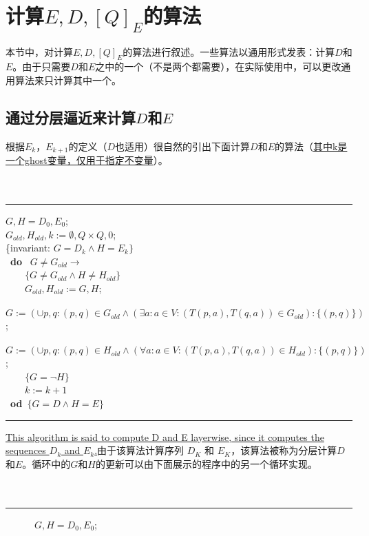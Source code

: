 
\chapter{计算$E,D,[Q]_E$的算法}
本节中，对计算$E,D,[Q]_E$的算法进行叙述。一些算法以通用形式发表：计算$D$和$E$。由于只需要$D$和$E$之中的一个（不是两个都需要），在实际使用中，可以更改通用算法来只计算其中一个。

\section{通过分层逼近来计算$D$和$E$}

根据$E_k$，$E_{k+1}$的定义（$D$也适用）很自然的引出下面计算$D$和$E$的算法（\uline{其中k是一个ghost变量，仅用于指定不变量}）。
\\
\\
\\
\rule{\textwidth}{1pt}
\mbox{}$G,H=D_0,E_0$;\\
\mbox{}$G_{old},H_{old},k:=\emptyset ,Q \times Q,0$;\\
\mbox{\{invariant:} $G=D_k \land H =E_k \}$\\
\mbox{ \textbf{do} } $G \not= G_{old} \longrightarrow$ \\
\mbox{　　}$\{G \not= G_{old} \land H \not= H_{old} \}$ \\
\mbox{　　}$G_{old},H_{old}:=G,H$;\\
\mbox{　　}$G:=(\cup  p,q:(p,q)\in G_{old}\land (\exists  a:a \in V : (T(p,a),T(q,a))\in G_{old} ) : \{(p,q)\})$; \\
\mbox{　　}$G:=(\cup  p,q:(p,q)\in H_{old}\land (\forall  a:a \in V : (T(p,a),T(q,a))\in H_{old} ) : \{(p,q)\})$; \\
\mbox{　　}$\{G=\neg H\}$ \\
\mbox{　　}$k:=k+1$ \\
\mbox{ \textbf{od} }$ \{ G=D \land H=E \}$ \\
\rule{\textwidth}{1pt}
\uline{This algorithm is said to compute D and E layerwise, since it computes the sequences $D_k$ and $E_k$.}由于该算法计算序列 $D_K$ 和 $E_K$，该算法被称为分层计算$D$和$E$。循环中的$G$和$H$的更新可以由下面展示的程序中的另一个循环实现。
\\
\\
\\
\rule{\textwidth}{1pt}
\mbox{　　　}$G,H=D_0,E_0$;\\
